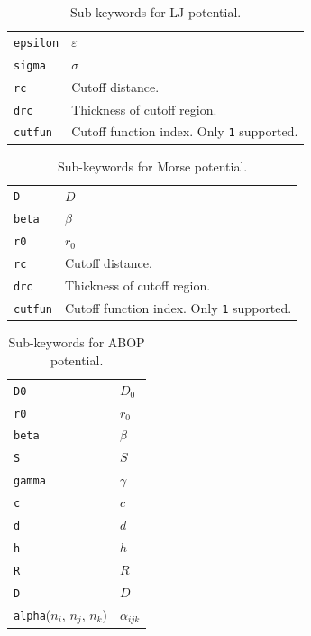 \documentclass[a4paper,12pt,onecolumn]{article}
\def\eps{\varepsilon}
\begin{document}
\begin{table}[!h]
\caption{
Sub-keywords for LJ potential.
\label{tab:kw-LJ}
}
\begin{center}
\begin{tabular}{|l|l|}
\hline
\hline
\verb+epsilon+ & $\eps$ \\
\verb+sigma+   & $\sigma$ \\
\verb+rc+      & Cutoff distance. \\
\verb+drc+     & Thickness of cutoff region. \\
\verb+cutfun+  & Cutoff function index. Only \verb+1+ supported. \\
\hline
\hline
\end{tabular}
\end{center}
\end{table}
%
\begin{table}[!h]
\caption{
Sub-keywords for Morse potential.
\label{tab:kw-M}
}
\begin{center}
\begin{tabular}{|l|l|}
\hline
\hline
\verb+D+       & $D$ \\
\verb+beta+    & $\beta$ \\
\verb+r0+      & $r_0$ \\
\verb+rc+      & Cutoff distance. \\
\verb+drc+     & Thickness of cutoff region. \\
\verb+cutfun+  & Cutoff function index. Only \verb+1+ supported. \\
\hline
\hline
\end{tabular}
\end{center}
\end{table}
%
\begin{table}[!h]
\caption{
Sub-keywords for ABOP potential.
\label{tab:kw-ABOP}
}
\begin{center}
\begin{tabular}{|l|l|}
\hline
\hline
\verb+D0+      & $D_0$ \\
\verb+r0+      & $r_0$ \\
\verb+beta+    & $\beta$ \\
\verb+S+       & $S$ \\
\verb+gamma+   & $\gamma$ \\
\verb+c+       & $c$ \\
\verb+d+       & $d$ \\
\verb+h+       & $h$ \\
\verb+R+       & $R$ \\
\verb+D+       & $D$ \\
\verb+alpha+($n_i$, $n_j$, $n_k$) & $\alpha_{ijk}$ \\
\hline
\hline
\end{tabular}
\end{center}
\end{table}
\end{document}
